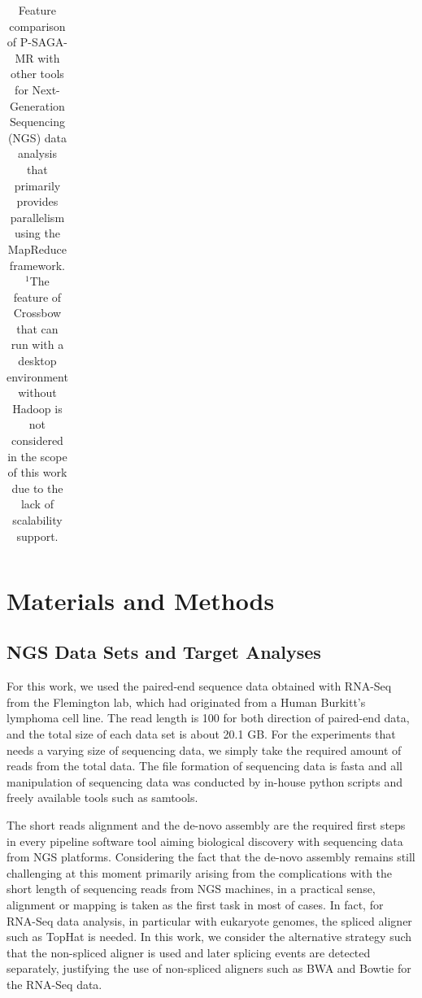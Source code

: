 \documentclass{sig-alternate}
\begin{document}
\begin{center}
\begin{table}[ht]
{\begin{tabular}{|l|l|c|c|c|c|c|c|}
\hline
\end{tabular}}
\hfill{}
\caption{Feature comparison of P-SAGA-MR with other tools for Next-Generation Sequencing (NGS) data analysis that primarily provides parallelism using the MapReduce framework.  $^{1}${The feature of Crossbow that can run with a desktop environment without Hadoop is not considered in the scope of this work due to the lack of scalability support.} }
 \label{table:mr-comparison}
\end{table}
\end{center}

\section{Materials and Methods}\label{sec:materials_and_methods}
\subsection{NGS Data Sets and Target Analyses}
For this work, we used the paired-end sequence data obtained with RNA-Seq from the Flemington lab, which had originated from a Human Burkitt's lymphoma cell line\cite{erik_2010}.  The read length is 100 for both direction of paired-end data, and the total size of each data set is about 20.1 GB.  For the experiments that needs a varying size of sequencing data, we simply take the required amount of reads from the total data.  The file formation of sequencing data is fasta and all manipulation of sequencing data was conducted by in-house python scripts and freely available tools such as samtools\cite{samtools}.  

The short reads alignment and the de-novo assembly are the required first steps in every pipeline software tool aiming biological discovery with sequencing data from NGS platforms.  Considering the fact that the de-novo assembly remains still challenging at this moment primarily arising from the complications with the short length of sequencing reads from NGS machines, in a practical sense, alignment or mapping is taken as the first task in most of cases.  In fact, for RNA-Seq data analysis, in particular with eukaryote genomes, the spliced aligner such as TopHat\cite{pepke2009} is needed. In this work, we consider the alternative strategy such that the non-spliced aligner is used and later splicing events are detected separately, justifying the use of non-spliced aligners such as BWA and Bowtie for the RNA-Seq data.
\end{document}
